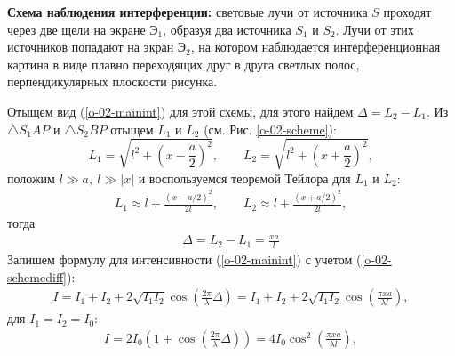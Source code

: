 \documentclass[__minimum__.tex]{subfiles}
\begin{document}
\textbf{Схема наблюдения интерференции:} световые лучи от источника $S$ проходят через две щели на экране $\text{Э}_1$, образуя два источника $S_1$ и $S_2$. Лучи от этих источников попадают на экран $\text{Э}_2$, на котором наблюдается интерференционная картина в виде плавно переходящих друг в друга светлых полос, перпендикулярных плоскости рисунка.

Отыщем вид (\ref{o-02-mainint}) для этой схемы, для этого найдем $\Delta = L_2 - L_1$. Из
$\triangle S_1AP$ и $\triangle S_2BP$ отыщем $L_1$ и $L_2$ (см. Рис. \ref{o-02-scheme}):
$$
    L_1 = \sqrt{l^2 + \left(x-\frac{a}{2}\right)^2}, \qquad
    L_2 = \sqrt{l^2 + \left(x+\frac{a}{2}\right)^2},
$$
положим $l \gg a, \ l \gg |x|$ и воспользуемся теоремой Тейлора для $L_1$ и $L_2$:
\begin{gather*}
    L_1 \approx l + \frac{\left(x-a/2\right)^2}{2l}, \qquad
    L_2 \approx l + \frac{\left(x+a/2\right)^2}{2l},
\end{gather*}
тогда
\begin{gather}
    \label{o-02-schemediff}
    \displaystyle \Delta = L_2 - L_1 = \frac{xa}{l}
\end{gather}
Запишем формулу для интенсивности (\ref{o-02-mainint}) с учетом (\ref{o-02-schemediff}):
\begin{gather*}
    I = I_1 + I_2 + 2\sqrt{I_1 I_2}\cos\left(\frac{2\pi}{\lambda}\Delta\right) =
    I_1 + I_2 + 2\sqrt{I_1 I_2}\cos\left(\frac{\pi x a}{\lambda l}\right),
\end{gather*}
для $I_1 = I_2 = I_0$:
\begin{gather}
    \label{o-02-intensesch}
    I = 2I_0\left(1 + \cos\left(\frac{2\pi}{\lambda}\Delta\right)\right) =
    4I_0\cos^2\left(\frac{\pi xa}{\lambda l}\right),
\end{gather}
\end{document}
